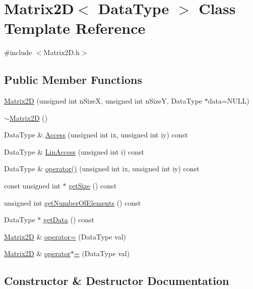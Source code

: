 \hypertarget{class_matrix2_d}{}\section{Matrix2\+D$<$ Data\+Type $>$ Class Template Reference}
\label{class_matrix2_d}


{\ttfamily \#include $<$Matrix2\+D.\+h$>$}

\subsection*{Public Member Functions}
\begin{DoxyCompactItemize}
\item 
\hyperlink{class_matrix2_d_a98da462a3ddf793587b9ca2418db70e9}{Matrix2\+D} (unsigned int n\+Size\+X, unsigned int n\+Size\+Y, Data\+Type $\ast$data=N\+U\+L\+L)
\item 
\hyperlink{class_matrix2_d_a4b911d3793085de5c2a4337d65973293}{$\sim$\+Matrix2\+D} ()
\item 
Data\+Type \& \hyperlink{class_matrix2_d_ae38024b6f299164dc29e4a41a021b17c}{Access} (unsigned int ix, unsigned int iy) const 
\item 
Data\+Type \& \hyperlink{class_matrix2_d_aeb645f6067a4bcce6e29ab37e0c2b67a}{Lin\+Access} (unsigned int i) const 
\item 
Data\+Type \& \hyperlink{class_matrix2_d_a5a12d1d056f99a320f40426cbb583610}{operator()} (unsigned int ix, unsigned int iy) const 
\item 
const unsigned int $\ast$ \hyperlink{class_matrix2_d_aec1488d6824828fad81ab3532aad7b52}{get\+Size} () const 
\item 
unsigned int \hyperlink{class_matrix2_d_a1c85bf28bf786fa7bdf36c3fc4aabd23}{get\+Number\+Of\+Elements} () const 
\item 
Data\+Type $\ast$ \hyperlink{class_matrix2_d_abf6d0d7ed643ba6d21ec4f6a26b260ad}{get\+Data} () const 
\item 
\hyperlink{class_matrix2_d}{Matrix2\+D} \& \hyperlink{class_matrix2_d_a63e3d38a7b27ba9ad08c6717275a5ee0}{operator=} (Data\+Type val)
\item 
\hyperlink{class_matrix2_d}{Matrix2\+D} \& \hyperlink{class_matrix2_d_a43da82d381e24e1e77223b105cc3189f}{operator$\ast$=} (Data\+Type val)
\end{DoxyCompactItemize}


\subsection{Constructor \& Destructor Documentation}
\hypertarget{class_matrix2_d_a98da462a3ddf793587b9ca2418db70e9}{}
